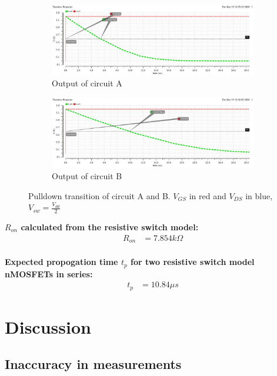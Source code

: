 \documentclass[onecolumn]{article}
\begin{document}
\begin{figure}[h!]
  \centering
  \begin{subfigure}{.75\textwidth}
    \includegraphics[width=1.1\linewidth]{task2a.jpg}
    \caption{Output of circuit A}
    \label{fig:sub7}
  \end{subfigure}
  \begin{subfigure}{.75\textwidth}
    \includegraphics[width=1.1\linewidth]{task2b.jpg}
    \caption{Output of circuit B}
    \label{fig:sub8}
  \end{subfigure}
  \caption{Pulldown transition of circuit A and B. $V_{GS}$ in red and $V_{DS}$ in blue, $V_{sw} = \frac{V_{dd}}{2}$}
  \label{fig:6}
\end{figure}

\textbf{$R_{on}$ calculated from the resistive switch model:}
\begin{align}
  R_{on} &= 7.854 k\Omega \nonumber \\
\end{align}

\textbf{Expected propogation time $t_p$ for two resistive switch model nMOSFETs in series:}
\begin{align}
  t_p &= 10.84 \mu s \nonumber
\end{align}



\section{Discussion}

\subsection{Inaccuracy in measurements}
\end{document}
